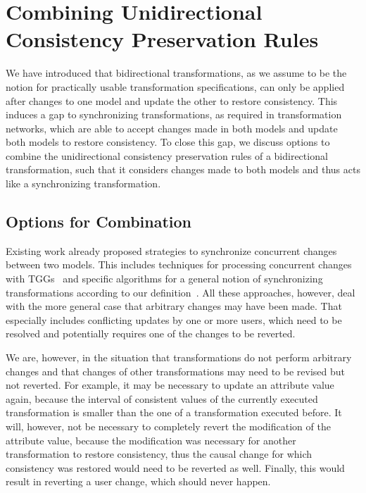 \section{Combining Unidirectional Consistency Preservation Rules}

We have introduced that bidirectional transformations, as we assume to be the notion for practically usable transformation specifications, can only be applied after changes to one model and update the other to restore consistency.
This induces a gap to synchronizing transformations, as required in transformation networks, which are able to accept changes made in both models and update both models to restore consistency.
To close this gap, we discuss options to combine the unidirectional consistency preservation rules of a bidirectional transformation, such that it considers changes made to both models and thus acts like a synchronizing transformation.


\subsection{Options for Combination}
\label{chap:synchronization:combination:options}

Existing work already proposed strategies to synchronize concurrent changes between two models.
This includes techniques for processing concurrent changes with \glspl{TGG}~\cite{hermann2012concurrentSynchronization-FASE,orejas2020IncrementalConcurrentSynchronization-FASE} and specific algorithms for a general notion of synchronizing transformations according to our definition~\cite{xiong2013SynchronizingConcurrentUpdates-SoSym,xiong2009parallelUpdates-ICMT}.
All these approaches, however, deal with the more general case that arbitrary changes may have been made.
That especially includes conflicting updates by one or more users, which need to be resolved and potentially requires one of the changes to be reverted.

We are, however, in the situation that transformations do not perform arbitrary changes and that changes of other transformations may need to be revised but not reverted.
For example, it may be necessary to update an attribute value again, because the interval of consistent values of the currently executed transformation is smaller than the one of a transformation executed before.
It will, however, not be necessary to completely revert the modification of the attribute value, because the modification was necessary for another transformation to restore consistency, thus the causal change for which consistency was restored would need to be reverted as well.
Finally, this would result in reverting a user change, which should never happen.

